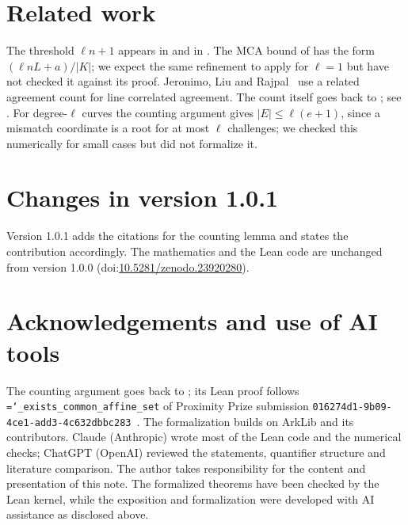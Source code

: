 \documentclass[11pt]{article}
\theoremstyle{definition}
\theoremstyle{remark}
\newcommand{\lean}[1]{\texttt{\hyphenchar\font=`\_\relax #1}}
\begin{document}
\section{Related work}

The threshold $\ell n+1$ appears in \cite[Thm.~3.5]{GG25} and in \cite[Thm.~2.10]{LCD26}. The MCA
bound of \cite[Thm.~2.13]{AGG26} has the form $(\ell nL+a)/|K|$; we expect the same refinement to
apply for $\ell=1$ but have not checked it against its proof. Jeronimo, Liu and
Rajpal~\cite{JLR26} use a related agreement count for line correlated agreement. The count
itself goes back to \cite{AHIV17,BKS18}; see \cite[Lemma~1]{Hab25}. For degree-$\ell$
curves the counting argument gives $|E|\le\ell(e+1)$, since a mismatch coordinate is a root for at
most $\ell$ challenges; we checked this numerically for small cases but did not formalize it.

\section*{Changes in version 1.0.1}
Version 1.0.1 adds the citations \cite{AHIV17,BKS18,Hab25} for the counting lemma and states the
contribution accordingly. The mathematics and the Lean code are unchanged from version 1.0.0
(doi:\href{https://doi.org/10.5281/zenodo.23920280}{10.5281/zenodo.23920280}).

\section*{Acknowledgements and use of AI tools}
The counting argument goes back to \cite{AHIV17,BKS18}; its Lean proof follows
\lean{exists\_common\_affine\_set} of Proximity Prize submission
\texttt{016274d1-9b09-4ce1-add3-4c632dbbc283}~\cite{BW}. The formalization builds on ArkLib and its contributors. Claude (Anthropic) wrote most
of the Lean code and the numerical checks; ChatGPT (OpenAI) reviewed the statements, quantifier
structure and literature comparison. The author takes responsibility for the content and
presentation of this note. The formalized theorems have been checked by the Lean kernel, while the
exposition and formalization were developed with AI assistance as disclosed above.
\end{document}
